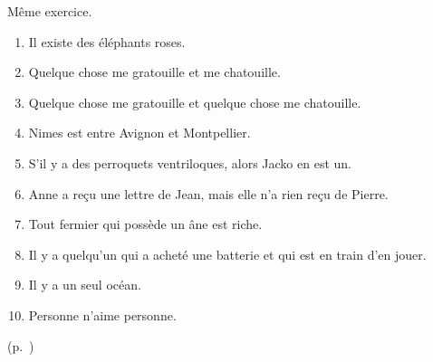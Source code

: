 \begin{exo}\label{e:version2LO}
Même exercice. 
\begin{enumerate}
\item Il existe des éléphants roses.
\item Quelque chose me gratouille et me chatouille.
\item Quelque chose me gratouille et quelque chose me chatouille.
\item Nimes est entre Avignon et Montpellier.
\item S'il y a des perroquets ventriloques, alors Jacko en est un.
\item Anne a reçu une lettre de Jean, mais elle n'a rien reçu de
  Pierre.
\item Tout fermier qui possède un âne est riche.
\item Il y a quelqu'un qui a acheté une batterie et qui est en train
  d'en jouer.
\item Il y a un seul océan.
\item Personne n'aime personne.
\end{enumerate}
\begin{solu} (p.~\pageref{e:version2LO}) %
\label{crg:version2LO}


\end{solu}
\end{exo}
